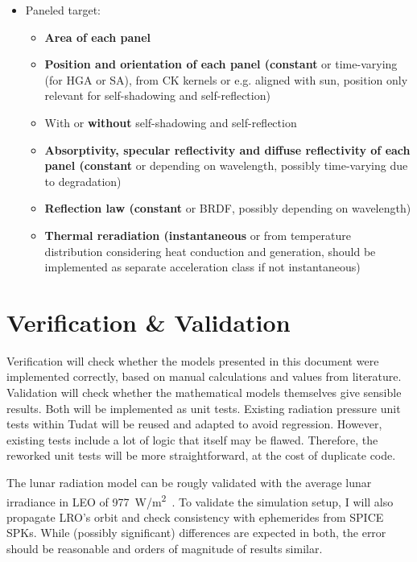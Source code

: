 \documentclass[parskip=full,DIV=15]{scrartcl}
\begin{document}
\begin{itemize}
   \item Paneled target:
   \begin{itemize}
      \item \textbf{Area of each panel}
      \item \textbf{Position and orientation of each panel (constant} or time-varying (for HGA or SA), from CK kernels or e.g. aligned with sun, position only relevant for self-shadowing and self-reflection)
      \item With or \textbf{without} self-shadowing and self-reflection
      \item \textbf{Absorptivity, specular reflectivity and diffuse reflectivity of each panel (constant} or depending on wavelength, possibly time-varying due to degradation)
      \item \textbf{Reflection law (constant} or BRDF, possibly depending on wavelength)
      \item \textbf{Thermal reradiation (instantaneous} or from temperature distribution considering heat conduction and generation, should be implemented as separate acceleration class if not instantaneous)
   \end{itemize}
\end{itemize}







\section{Verification \& Validation}
Verification will check whether the models presented in this document were implemented correctly, based on manual calculations and values from literature. Validation will check whether the mathematical models themselves give sensible results. Both will be implemented as unit tests. Existing radiation pressure unit tests within Tudat will be reused and adapted to avoid regression. However, existing tests include a lot of logic that itself may be flawed. Therefore, the reworked unit tests will be more straightforward, at the cost of duplicate code.

The lunar radiation model can be rougly validated with the average lunar irradiance in LEO of \SI{977}{W/m^2}~\cite{Matthews2008}. To validate the simulation setup, I will also propagate LRO's orbit and check consistency with ephemerides from SPICE SPKs. While (possibly significant) differences are expected in both, the error should be reasonable and orders of magnitude of results similar.
\end{document}
